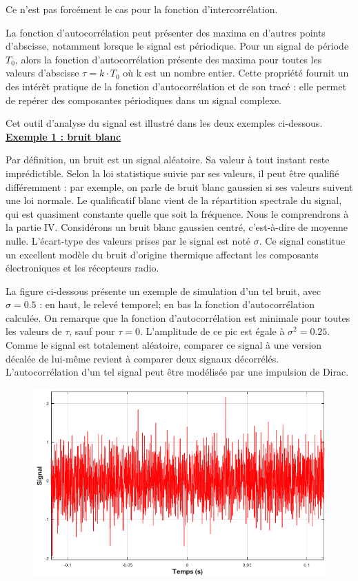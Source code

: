 	Ce n'est pas forcément le cas pour la fonction d'intercorrélation.
	 
	La fonction d'autocorrélation peut présenter des maxima en d'autres points d'abscisse, notamment lorsque le signal est périodique. Pour un signal de période $T_{0}$, alors la fonction d'autocorrélation présente des maxima pour toutes les valeurs d'abscisse $\tau = k\cdot T_{0}$ où k est un nombre entier. Cette propriété fournit un des intérêt pratique de la fonction d'autocorrélation et de son tracé : elle permet de repérer des composantes périodiques dans un signal complexe. 
	
	Cet outil d'analyse du signal est illustré dans les deux exemples ci-dessous.\\
	
	\underline{\textbf{Exemple 1 : bruit blanc}}
	
	Par définition, un bruit est un signal aléatoire. Sa valeur à tout instant reste imprédictible. Selon la loi statistique suivie par ses valeurs, il peut être qualifié différemment : par exemple, on parle de bruit blanc gaussien si ses valeurs suivent une loi normale. Le qualificatif blanc vient de la répartition spectrale du signal, qui est quasiment constante quelle que soit la fréquence. Nous le comprendrons à la partie IV.
	Considérons un bruit blanc gaussien centré, c'est-à-dire de moyenne nulle. L'écart-type des valeurs prises par le signal est noté $\sigma$. Ce signal constitue un excellent modèle du bruit d'origine thermique affectant les composants électroniques et les récepteurs radio.
	
	La figure ci-dessous présente un exemple de simulation d'un tel bruit, avec $\sigma=0.5$ : en haut, le relevé temporel; en bas la fonction d'autocorrélation calculée. On remarque que la fonction d'autocorrélation est minimale pour toutes les valeurs de $\tau$, sauf pour $\tau = 0$. L'amplitude de ce pic est égale à $\sigma^{2} = 0.25$. Comme le signal est totalement aléatoire, comparer ce signal à une version décalée de lui-même revient à comparer deux signaux décorrélés. L'autocorrélation d'un tel signal peut être modélisée par une impulsion de Dirac.
	
	\begin{figure}[h!]
		\centering
		\includegraphics[scale=0.6]{images/Mesure_autocorr_bruit.png}
	\end{figure}
	
